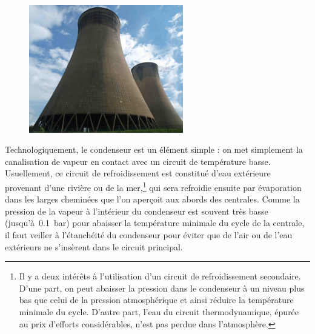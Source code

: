 		\begin{figure}
			\begin{center}
				\includegraphics[width=0.6\textwidth]{images/cooling_towers.jpg}
			\end{center}
			\label{fig_centrale_condenseur3}
		\end{figure}

		Technologiquement, le condenseur est un élément simple : on met simplement la canalisation de vapeur en contact avec un circuit de température basse. Usuellement, ce circuit de refroidissement est constitué d’eau extérieure provenant d’une rivière ou de la mer,\footnote{Il y a deux intérêts à l’utilisation d’un circuit de refroidissement secondaire. D’une part, on peut abaisser la pression dans le condenseur à un niveau plus bas que celui de la pression atmosphérique et ainsi réduire la température minimale du cycle. D’autre part, l’eau du circuit thermodynamique, épurée au prix d’efforts considérables, n’est pas perdue dans l’atmosphère.}
		qui sera refroidie ensuite par évaporation dans les larges cheminées que l’on aperçoit aux abords des centrales. Comme la pression de la vapeur à l’intérieur du condenseur est souvent très basse (jusqu’à~\SI{0,1}{\bar}) pour abaisser la température minimale du cycle de la centrale, il faut veiller à l’étanchéité du condenseur pour éviter que de l’air ou de l’eau extérieurs ne s’insèrent dans le circuit principal.

